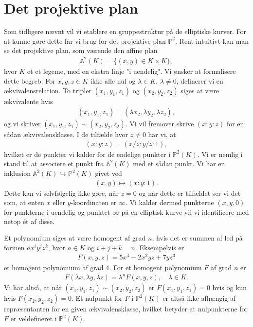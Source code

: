 \section{Det projektive plan}
Som tidligere nævnt vil vi etablere en gruppestruktur på de elliptiske
kurver. For at kunne gøre dette får vi brug for det projektive plan 
$\mathbb{P}^2$. Rent intuitivt kan man se det projektive plan, som
værende den affine plan 
\begin{align*}
	\mathbb{A}^2(K) = \{ (x, y) \in K \times K \},
\end{align*}
hvor $K$ et et legeme, med en ekstra linje "i uendelig". 
Vi ønsker at formalisere dette begreb. 
For $x, y, z \in K$ ikke alle nul og $\lambda \in K$, $\lambda \neq 0$, 
definerer vi en ækvivalensrelation. To tripler $(x_1, y_1, z_1)$ og 
$(x_2, y_2, z_2)$ siges at være ækvivalente hvis 
\begin{align*}
	(x_1, y_1, z_1) = (\lambda x_2, \lambda y_2, \lambda z_2),
\end{align*}
og vi skriver $(x_1, y_1, z_1) \sim (x_2, y_2, z_2)$. Vi vil fremover skrive
$(x:y:z)$ for en sådan ækvivalensklasse. I de tilfælde hvor $z \neq 0$ har vi, at
\begin{align*}
	(x : y : z) = (x/z : y/z : 1),
\end{align*}
hvilket er de punkter vi kalder for de endelige punkter i $\mathbb{P}^2(K)$.
Vi er nemlig i stand til at associere et punkt fra $\mathbb{A}^2(K)$ med et sådan
punkt. Vi har en inklusion $\mathbb{A}^2(K) \hookrightarrow \mathbb{P}^2(K)$ givet ved
\begin{align*}
	(x, y) \mapsto (x : y : 1).
\end{align*}
Dette kan vi selvfølgelig ikke gøre, når $z=0$ og når dette er tilfældet ser vi det som, at enten $x$ eller $y$-koordinaten er $\infty$. Vi kalder dermed punkterne
$(x, y, 0)$ for punkterne i uendelig og punktet $\infty$ på en elliptisk kurve vil vi identificere med netop ét af disse.

Et polynomium siges at være homogent af grad $n$, hvis det er summen af led på formen $ax^i y^j z^k$, hvor $a \in K$ og $i + j + k = n$. Eksempelvis er 
\begin{align*}
	F(x, y, z) = 5x^4 - 2x^2 yz + 7yz^3
\end{align*}
et homogent polynomium af grad $4$. For et homogent polynomium $F$ af grad $n$ er
\begin{align*}
	F(\lambda x, \lambda y, \lambda z) = \lambda^n F(x, y, z), \quad \lambda \in K.
\end{align*}
Vi har altså, at når $(x_1, y_1, z_1) \sim (x_2, y_2, z_2)$ er $F(x_1, y_1, z_1) = 0$ hvis og kun hvis $F(x_2, y_2, z_2) = 0$. Et nulpunkt for $F$ i $\mathbb{P}^{2}(K)$ er altså ikke afhængig af repræsentanten for en given ækvivalensklasse, hvilket betyder at nulpunkterne for $F$ er veldefineret i $\mathbb{P}^{2}(K)$.

